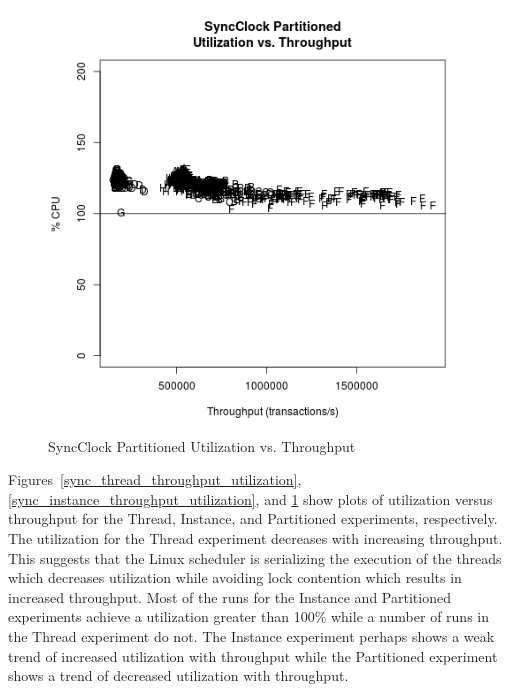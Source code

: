 \begin{figure}[H]
\center
\includegraphics[height=.4\textheight]{sync_partitioned_throughput_utilization.png}
\caption{SyncClock Partitioned Utilization vs. Throughput}
\label{sync_partitioned_throughput_utilization}
\end{figure}

Figures~\ref{sync_thread_throughput_utilization}, \ref{sync_instance_throughput_utilization}, and \ref{sync_partitioned_throughput_utilization} show plots of utilization versus throughput for the Thread, Instance, and Partitioned experiments, respectively.
The utilization for the Thread experiment decreases with increasing throughput.
This suggests that the Linux scheduler is serializing the execution of the threads which decreases utilization while avoiding lock contention which results in increased throughput.
Most of the runs for the Instance and Partitioned experiments achieve a utilization greater than 100\% while a number of runs in the Thread experiment do not.
The Instance experiment perhaps shows a weak trend of increased utilization with throughput while the Partitioned experiment shows a trend of decreased utilization with throughput.

